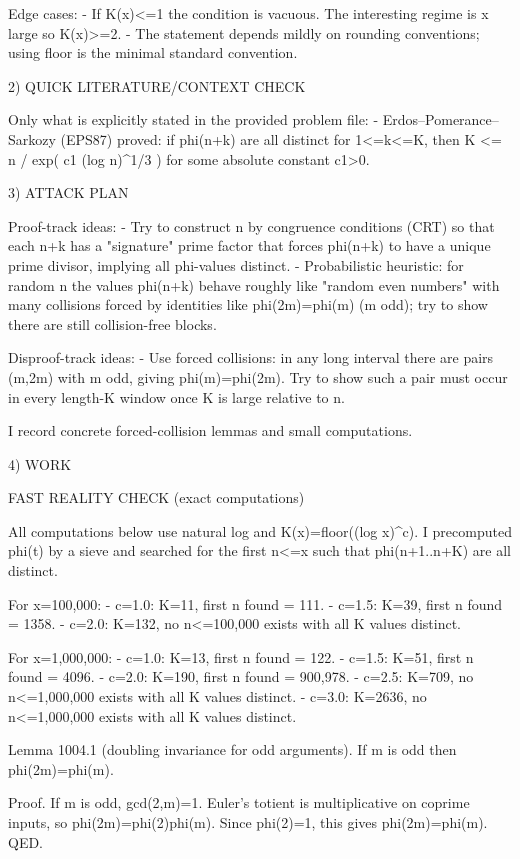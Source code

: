 Edge cases:
- If K(x)<=1 the condition is vacuous. The interesting regime is x large so K(x)>=2.
- The statement depends mildly on rounding conventions; using floor is the minimal standard convention.

2) QUICK LITERATURE/CONTEXT CHECK

Only what is explicitly stated in the provided problem file:
- Erdos--Pomerance--Sarkozy (EPS87) proved: if phi(n+k) are all distinct for 1<=k<=K, then
    K <= n / exp( c1 (log n)^{1/3} )
  for some absolute constant c1>0.

3) ATTACK PLAN

Proof-track ideas:
- Try to construct n by congruence conditions (CRT) so that each n+k has a "signature" prime factor that forces phi(n+k) to have a unique prime divisor, implying all phi-values distinct.
- Probabilistic heuristic: for random n the values phi(n+k) behave roughly like "random even numbers" with many collisions forced by identities like phi(2m)=phi(m) (m odd); try to show there are still collision-free blocks.

Disproof-track ideas:
- Use forced collisions: in any long interval there are pairs (m,2m) with m odd, giving phi(m)=phi(2m). Try to show such a pair must occur in every length-K window once K is large relative to n.

I record concrete forced-collision lemmas and small computations.

4) WORK

FAST REALITY CHECK (exact computations)

All computations below use natural log and K(x)=floor((log x)^c).
I precomputed phi(t) by a sieve and searched for the first n<=x such that phi(n+1..n+K) are all distinct.

For x=100,000:
- c=1.0: K=11, first n found = 111.
- c=1.5: K=39, first n found = 1358.
- c=2.0: K=132, no n<=100,000 exists with all K values distinct.

For x=1,000,000:
- c=1.0: K=13, first n found = 122.
- c=1.5: K=51, first n found = 4096.
- c=2.0: K=190, first n found = 900,978.
- c=2.5: K=709, no n<=1,000,000 exists with all K values distinct.
- c=3.0: K=2636, no n<=1,000,000 exists with all K values distinct.

Lemma 1004.1 (doubling invariance for odd arguments).
If m is odd then phi(2m)=phi(m).

Proof.
If m is odd, gcd(2,m)=1. Euler's totient is multiplicative on coprime inputs, so
  phi(2m)=phi(2)phi(m).
Since phi(2)=1, this gives phi(2m)=phi(m).  QED.


